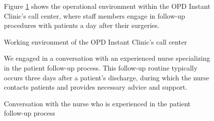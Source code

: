 \documentclass[12pt,oneside,openright,a4paper]{cpe-english-project}
\begin{document}
      \begin{figure}[!h]
        \centering
        \caption{Working environment of the OPD Instant Clinic's call center}\label{fig:Interview_2}
        \begin{justify}
          \qquad Figure \ref{fig:Interview_2} shows the operational environment within the OPD Instant Clinic's call center, where staff members engage in follow-up procedures with patients a day after their surgeries. \par
        \end{justify}
      \end{figure}
      \begin{figure}
        \centering
        \caption{Conversation with the nurse who is experienced in the patient follow-up process}\label{fig:Interview_3}
        \begin{justify}
          \qquad We engaged in a conversation with an experienced nurse specializing in the patient follow-up process. This follow-up routine typically occurs three days after a patient's discharge, during which the nurse contacts patients and provides necessary advice and support. \par
        \end{justify}
      \end{figure}
\end{document}
